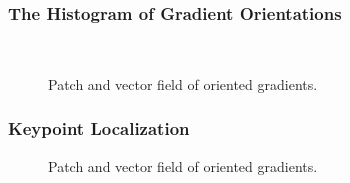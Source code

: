 \documentclass[aspectratio=169]{beamer}
\begin{document}
\begin{frame}
\frametitle{The Histogram of Gradient Orientations}
\begin{center}
\begin{figure}[h!]
\centering
\setlength\fboxsep{0pt}
\setlength\fboxrule{0.5pt}
\\
\caption[Histogram of Gradient Orientations]{Patch and vector field of oriented gradients.}
\label{fig:sampledescriptor}
\end{figure}
\end{center}
\end{frame}


\begin{frame}
\frametitle{Keypoint Localization}
\begin{center}
\begin{figure}[h!]
\centering
\setlength\fboxsep{0pt}
\setlength\fboxrule{0.5pt}
\caption[Histogram of Gradient Orientations]{Patch and vector field of oriented gradients.}
\label{fig:sampledescriptor}
\end{figure}
\end{center}
\end{frame}
\end{document}
